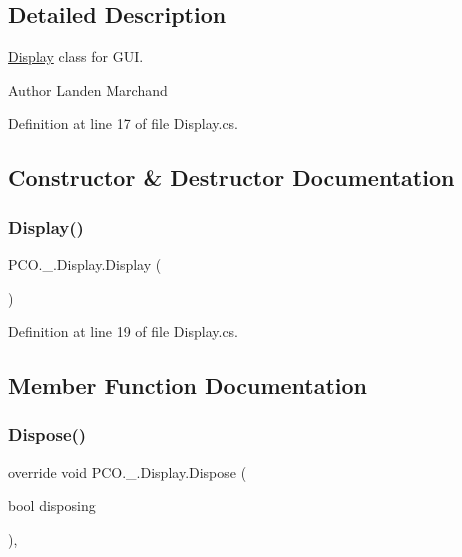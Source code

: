 \subsection{Detailed Description}
\hyperlink{classPCO_1_1__0_1_1Display}{Display} class for G\+UI. 

\begin{DoxyAuthor}{Author}
Landen Marchand 
\end{DoxyAuthor}


Definition at line 17 of file Display.\+cs.



\subsection{Constructor \& Destructor Documentation}
\mbox{\label{classPCO_1_1__0_1_1Display_a4f14e8f662deb892a2c07dc78da701dc}} 
\subsubsection{\texorpdfstring{Display()}{Display()}}
{\footnotesize\ttfamily P\+C\+O.\+\_.\+Display.\+Display (\begin{DoxyParamCaption}{ }\end{DoxyParamCaption})\hspace{0.3cm}{\ttfamily [inline]}}



Definition at line 19 of file Display.\+cs.



\subsection{Member Function Documentation}
\mbox{\label{classPCO_1_1__0_1_1Display_aeec182b8e0272728a07deb3245fb3ef2}} 
\subsubsection{\texorpdfstring{Dispose()}{Dispose()}}
{\footnotesize\ttfamily override void P\+C\+O.\+\_.\+Display.\+Dispose (\begin{DoxyParamCaption}\item[{bool}]{disposing }\end{DoxyParamCaption})\hspace{0.3cm}{\ttfamily [inline]}, {\ttfamily [protected]}}




